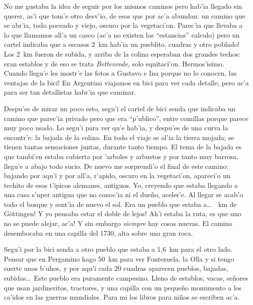 No me gustaba la idea de seguir por los mismos caminos pero hab'ia llegado sin
querer, as'i que tom'e otro desv'io, de esos que por ac'a abundan: un camino que
se abr'ia, todo poceado y viejo, oscuro por la vegetaci'on. Parec'ia que llevaba
a lo que llamamos all'a un casco (ac'a no existen las ``estancias'' calculo)
pero un cartel indicaba que a escasos 2~km hab'ia un pueblito.  cuadras y otro poblado! Los 2~km fueron de subida, y arriba de la colina
esperaban dos grandes techos: eran establos y de eso se trata \emph{Bettenrode},
solo equitaci'on. Hermos'isimo. Cuando llegu'e les mostr'e las fotos a Gustavo e
Ina porque no lo conocen, \textexclamdown las ventajas de la bici! En Argentina
viajamos en bici para ver cada detalle, pero ac'a para ser tan detallistas
habr'ia que caminar.

Despu'es de mirar un poco esto, segu'i el cartel de bici senda que indicaba
un camino que parec'ia privado pero que era ``p'ublico'', entre comillas porque
parece muy poco usado. Lo segu'i para ver qu'e hab'ia, y despu'es de una curva
la encontr'e: la bajada de la colina. En todo el viaje se ol'ia la tierra
mojada; se tienen tantas sensaciones juntas, durante tanto tiempo. El tema de la
bajada es que tambi'en estaba cubierta por 'arboles y arbustos y por tanto muy
barrosa, llegu'e a abajo todo sucio. De nuevo me sorprendi'o el final de este
camino: bajando por aqu'i y por all'a, r'apido, oscuro en la vegetaci'on,
apareci'o un techito de esos t'ipicos alemanes, antiguos. Yo, creyendo que
estaba llegando a una casa s'uper antigua que no conoc'ia ni el due\~no,
aceler'e. Al llegar se acab'o todo el bosque y sent'ia de nuevo el sol. Era un
pueblo que estaba a\ldots\ ~km de G\"ottingen! \textexclamdown
Y yo pensaba estar el doble de lejos! Ah'i estaba la ruta, \textexclamdown es
que uno no se puede alejar, ac'a! Y sin embargo \emph{siempre} hay cosas nuevas.
El camino desembocaba en una capilla del 1730, alta sobre una gran roca.

Segu'i por la bici senda a otro pueblo que estaba a 1,6~km para el otro lado.
Pensar que en Pergamino hago 50~km para ver Fontezuela, la Olla y si tengo
suerte unos b'uhos, y por aqu'i cada 20 cuadras aparecen pueblos, bajadas,
subidas\ldots\ Este pueblo era puramente campesino. Lleno de establos, vacas,
se\~nores que usan jardineritos, tractores, y una capilla con un peque\~no
monumento a los ca'idos en las guerras mundiales. Para mi los libros para
ni\~nos se escriben ac'a.


